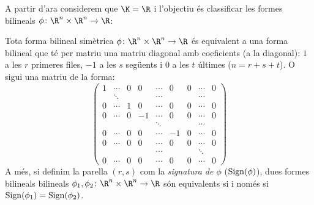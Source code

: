 A partir d'ara considerem que $\K=\R$ i l'objectiu és classificar les formes bilineals $\phi\colon \R^n\times \R^n \to \R$:
\begin{teorema}\label{teo:class_form:bilR}
Tota forma bilineal simètrica $\phi\colon \R^n\times \R^n\to \R$ és equivalent a una forma bilineal que té per matriu una matriu diagonal amb coeficients (a la diagonal): $1$ a les $r$ primeres files, $-1$ a les $s$ següents i $0$ a les $t$ últimes ($n=r+s+t$). O sigui una matriu de la forma:
\[
\begin{pmatrix}
1      & \cdots & 0 & 0 & \cdots & 0 & 0 & \cdots & 0 \\
       & \ddots &   &   & \cdots &   &   & \cdots &  \\
0      & \cdots & 1 & 0 & \cdots & 0 & 0 & \cdots & 0 \\
0      & \cdots & 0 & -1 & \cdots & 0 & 0 & \cdots & 0 \\
       &        &   &    & \ddots &   &   & \cdots &   \\
0      & \cdots & 0 &  0 & \cdots & -1 & 0 & \cdots & 0 \\
0      & \cdots & 0 &  0 & \cdots & 0 & 0 & \cdots & 0 \\
       &        &   &    & \cdots &   &   & \ddots &   \\
0      & \cdots & 0 &  0 & \cdots & 0 & 0 & \cdots & 0 
\end{pmatrix}
\]
A més, si definim la parella $(r,s)$ com la \emph{signatura de $\phi$} ($\operatorname{Sign}(\phi)$), dues formes bilineals bilineals $\phi_1,\phi_2\colon \R^n\times \R^n\to \R$ són equivalents si i només si $\operatorname{Sign}(\phi_1)=\operatorname{Sign}(\phi_2)$.
\end{teorema}
